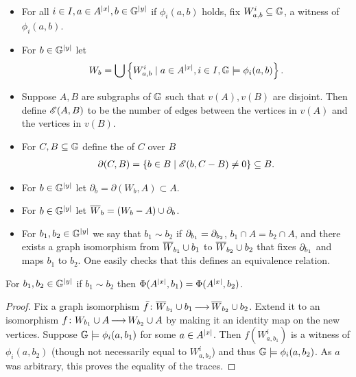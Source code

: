 \begin{Definition} \label{def_e}\ 
  \begin{itemize}
  \item For all $i \in I, a \in A^{|x|}, b \in \mathbb G^{|y|}$ if $\phi_i(a, b)$ holds, fix $W^i_{a,b} \subseteq \mathbb G$, a witness of $\phi_i(a, b)$.
  \item For $b \in \mathbb G^{|y|}$ let 
    \begin{align*}
      W_b = \bigcup \left\{W^i_{a,b} \mid a \in A^{|x|}, i \in I, \mathbb G \models \phi_i(a,b)\right\}.
    \end{align*}
  \item Suppose $A, B$ are subgraphs of $\mathbb G$ such that $v(A), v(B)$ are disjoint.
    Then define $\mathscr E(A, B)$ to be the number of edges between the vertices in $v(A)$ and the vertices in $v(B)$.
  \item For $C, B \subseteq \mathbb G$ define the \defn{boundary} of $C$ over $B$
    \begin{align*}
      \partial(C, B) = \left\{b \in B \mid \mathscr E(b, C - B) \neq 0\right\} \subseteq B.
    \end{align*}
  \item For $b \in \mathbb G^{|y|}$ let $\partial_b = \partial(W_b, A) \subset A$.
  \item For $b \in \mathbb G^{|y|}$ let ${\overline{W}}_b = (W_b - A) \cup \partial_b$.
  \item For $b_1, b_2 \in \mathbb G^{|y|}$ we say that $b_1 \sim b_2$ if $\partial_{b_1} = \partial_{b_2}$,
    $b_1 \cap A = b_2 \cap A$,
    and there exists a graph isomorphism from ${\overline{W}}_{b_1} \cup b_1$ to ${\overline{W}}_{b_2} \cup b_2$
    that fixes $\partial_{b_1}$ and
    maps $b_1$ to $b_2$.
    One easily checks that this defines an equivalence relation.
  \end{itemize}
\end{Definition}

\begin{Lemma} \label {bound_trace}
  For $b_1, b_2 \in \mathbb G^{|y|}$ if $b_1 \sim b_2$ then $\Phi(A^{|x|}, b_1) = \Phi(A^{|x|}, b_2)$.
\end{Lemma}

\begin{proof}
  Fix a graph isomorphism $\bar f \colon {\overline{W}}_{b_1} \cup b_1 \operatorname{\longrightarrow} {\overline{W}}_{b_2} \cup b_2$.
  Extend it to an isomorphism $f \colon W_{b_1} \cup A \operatorname{\longrightarrow} W_{b_2} \cup A$ by making it an identity map on the new vertices.
  Suppose $\mathbb G \models \phi_i(a, b_1)$ for some $a \in A^{|x|}$.
  Then $f(W^i_{a, b_1})$ is a witness of $\phi_i(a, b_2)$ (though not necessarily equal to $W^i_{a, b_2}$)
  and thus $\mathbb G \models \phi_i(a, b_2)$.
  As $a$ was arbitrary, this proves the equality of the traces.
\end{proof}

